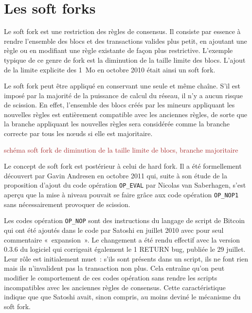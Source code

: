 \section*{Les soft forks}

Le soft fork est une restriction des règles de consensus. Il consiste par essence à rendre l'ensemble des blocs et des transactions valides plus petit, en ajoutant une règle ou en modifiant une règle existante de façon plus restrictive. L'exemple typique de ce genre de fork est la diminution de la taille limite des blocs. L'ajout de la limite explicite des 1~Mo en octobre 2010 était ainsi un soft fork.

Le soft fork peut être appliqué en conservant une seule et même chaîne. S'il est imposé par la majorité de la puissance de calcul du réseau, il n'y a aucun risque de scission. En effet, l'ensemble des blocs créés par les mineurs appliquant les nouvelles règles est entièrement compatible avec les anciennes règles, de sorte que la branche appliquant les nouvelles règles sera considérée comme la branche correcte par tous les nœuds si elle est majoritaire.

\textcolor{brown}{schéma soft fork de diminution de la taille limite de blocs, branche majoritaire}

Le concept de soft fork est postérieur à celui de hard fork. Il a été formellement découvert par Gavin Andresen en octobre 2011 qui, suite à son étude de la proposition d'ajout du code opération \texttt{OP\_EVAL} par Nicolas van Saberhagen, s'est aperçu que la mise à niveau pouvait se faire grâce aux code opération \texttt{OP\_NOP1} sans nécessairement provoquer de scission.

Les codes opération \texttt{OP\_NOP} sont des instructions du langage de script de Bitcoin qui ont été ajoutés dans le code par Satoshi en juillet 2010 avec pour seul commentaire «~expansion~». Le changement a été rendu effectif avec la version 0.3.6 du logiciel qui corrigeait également le 1 RETURN bug, publiée le 29 juillet. Leur rôle est initialement muet~: s'ils sont présents dans un script, ils ne font rien mais ils n'invalident pas la transaction non plus. Cela entraîne qu'on peut modifier le comportement de ces codes opération sans rendre les scripts incompatibles avec les anciennes règles de consensus. Cette caractéristique indique que que Satoshi avait, sinon compris, au moins deviné le mécanisme du soft fork.

